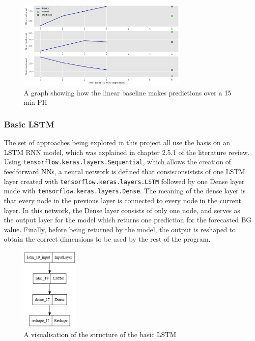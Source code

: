           \begin{figure}[H]
            \centering

            \includegraphics[width=0.75\textwidth]{images/linearbase.png}
            \caption{
             A graph showing how the linear baseline makes predictions over a 15 min PH
            }
          \end{figure}

      \subsubsection{Basic LSTM}

      The set of approaches being explored in this project all use the basis on an LSTM RNN model, which was explained in chapter 2.5.1 of the literature review. Using \Verb+tensorflow.keras.layers.Sequential+, which allows the creation of feedforward NNs, a neural network is defined that consisconsiststs of one LSTM layer created with \Verb+tensorflow.keras.layers.LSTM+ followed by one Dense layer made with \Verb|tensorflow.keras.layers.Dense|\allowbreak. The meaning of the dense layer is that every node in the previous layer is connected to every node in the current layer. In this network, the Dense layer consists of only one node, and serves as the output layer for the model which returns one prediction for the forecasted BG value. Finally, before being returned by the model, the output is reshaped to obtain the correct dimensions to be used by the rest of the program.

      \begin{figure}[H]
        \centering

        \includegraphics[width=0.25\textwidth]{images/BasicLSTM.png}
        \caption{
         A visualisation of the structure of the basic LSTM
        }
      \end{figure}

